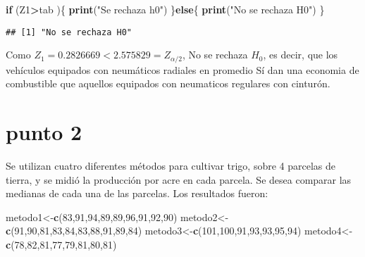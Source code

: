 \documentclass[
]{article}
\newenvironment{Shaded}{\begin{snugshade}}{\end{snugshade}}
\newcommand{\ControlFlowTok}[1]{\textcolor[rgb]{0.13,0.29,0.53}{\textbf{#1}}}
\newcommand{\DecValTok}[1]{\textcolor[rgb]{0.00,0.00,0.81}{#1}}
\newcommand{\FunctionTok}[1]{\textcolor[rgb]{0.13,0.29,0.53}{\textbf{#1}}}
\newcommand{\NormalTok}[1]{#1}
\newcommand{\OtherTok}[1]{\textcolor[rgb]{0.56,0.35,0.01}{#1}}
\newcommand{\SpecialCharTok}[1]{\textcolor[rgb]{0.81,0.36,0.00}{\textbf{#1}}}
\newcommand{\StringTok}[1]{\textcolor[rgb]{0.31,0.60,0.02}{#1}}
\begin{document}
\begin{Shaded}
\begin{Highlighting}[]
\ControlFlowTok{if}\NormalTok{ (Z1}\SpecialCharTok{\textgreater{}}\NormalTok{tab )\{}
  \FunctionTok{print}\NormalTok{(}\StringTok{"Se rechaza h0"}\NormalTok{)}
\NormalTok{\}}\ControlFlowTok{else}\NormalTok{\{}
  \FunctionTok{print}\NormalTok{(}\StringTok{"No se rechaza H0"}\NormalTok{)}
\NormalTok{\}}
\end{Highlighting}
\end{Shaded}

\begin{verbatim}
## [1] "No se rechaza H0"
\end{verbatim}

Como \(Z_1 = 0.2826669 < 2.575829 = Z _{\alpha/2}\), No se rechaza
\(H_0\), es decir, que los vehículos equipados con neumáticos radiales
en promedio Sí dan una economia de combustible que aquellos equipados
con neumaticos regulares con cinturón.

\hypertarget{punto-2}{%
\section{punto 2}\label{punto-2}}

Se utilizan cuatro diferentes métodos para cultivar trigo, sobre 4
parcelas de tierra, y se midió la producción por acre en cada parcela.
Se desea comparar las medianas de cada una de las parcelas. Los
resultados fueron:

\begin{Shaded}
\begin{Highlighting}[]
\NormalTok{metodo1}\OtherTok{\textless{}{-}}\FunctionTok{c}\NormalTok{(}\DecValTok{83}\NormalTok{,}\DecValTok{91}\NormalTok{,}\DecValTok{94}\NormalTok{,}\DecValTok{89}\NormalTok{,}\DecValTok{89}\NormalTok{,}\DecValTok{96}\NormalTok{,}\DecValTok{91}\NormalTok{,}\DecValTok{92}\NormalTok{,}\DecValTok{90}\NormalTok{)}
\NormalTok{metodo2}\OtherTok{\textless{}{-}}\FunctionTok{c}\NormalTok{(}\DecValTok{91}\NormalTok{,}\DecValTok{90}\NormalTok{,}\DecValTok{81}\NormalTok{,}\DecValTok{83}\NormalTok{,}\DecValTok{84}\NormalTok{,}\DecValTok{83}\NormalTok{,}\DecValTok{88}\NormalTok{,}\DecValTok{91}\NormalTok{,}\DecValTok{89}\NormalTok{,}\DecValTok{84}\NormalTok{)}
\NormalTok{metodo3}\OtherTok{\textless{}{-}}\FunctionTok{c}\NormalTok{(}\DecValTok{101}\NormalTok{,}\DecValTok{100}\NormalTok{,}\DecValTok{91}\NormalTok{,}\DecValTok{93}\NormalTok{,}\DecValTok{93}\NormalTok{,}\DecValTok{95}\NormalTok{,}\DecValTok{94}\NormalTok{)}
\NormalTok{metodo4}\OtherTok{\textless{}{-}}\FunctionTok{c}\NormalTok{(}\DecValTok{78}\NormalTok{,}\DecValTok{82}\NormalTok{,}\DecValTok{81}\NormalTok{,}\DecValTok{77}\NormalTok{,}\DecValTok{79}\NormalTok{,}\DecValTok{81}\NormalTok{,}\DecValTok{80}\NormalTok{,}\DecValTok{81}\NormalTok{)}
\end{Highlighting}
\end{Shaded}
\end{document}
